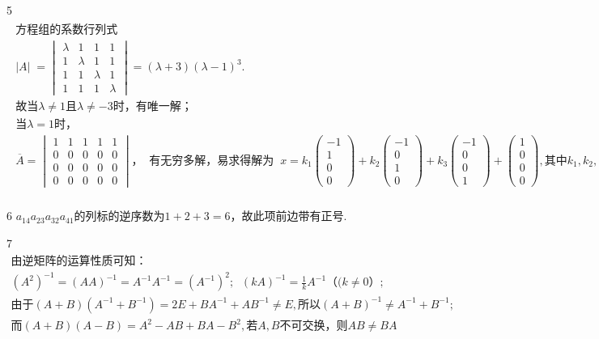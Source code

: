 5
$\begin{array}{l}\begin{array}{l}\mathrm{方程组的系数行列式}\\\left|A\right|\;=\begin{vmatrix}\lambda&1&1&1\\1&\lambda&1&1\\1&1&\lambda&1\\1&1&1&\lambda\end{vmatrix}=\left(\lambda+3\right)\left(\lambda-1\right)^3.\;\;\\\mathrm{故当}\lambda\neq1且\lambda\neq-3时，\mathrm{有唯一解}；\;\;\\当\lambda=1时，\\\overline A=\begin{vmatrix}1&1&1&1&1\\0&0&0&0&0\\0&0&0&0&0\\0&0&0&0&0\end{vmatrix}，\;\;\mathrm{有无穷多解}，\mathrm{易求得解为}\;\;x=k_1\begin{pmatrix}-1\\1\\0\\0\end{pmatrix}+k_2\begin{pmatrix}-1\\0\\1\\0\end{pmatrix}+k_3\begin{pmatrix}-1\\0\\0\\1\end{pmatrix}+\begin{pmatrix}1\\0\\0\\0\end{pmatrix},\mathrm{其中}k_1,k_2,k_3\in R\end{array}\\\end{array}$


6
$a_{14}a_{23}a_{32}a_{41}\mathrm{的列标的逆序数为}1+2+3=6，\mathrm{故此项前边带有正号}.$


7
$\begin{array}{l}\mathrm{由逆矩阵的运算性质可知}：\\(A^2)^{-1}=(AA)^{-1}=A^{-1}A^{-1}=(A^{-1})^2;\;\;(kA)^{-1}=\frac1kA^{-1}（(k\neq0）;\\\mathrm{由于}(A+B)(A^{-1}+B^{-1})=2E+BA^{-1}+AB^{-1}\neq E,\mathrm{所以}(A+B)^{-1}\neq A^{-1}+B^{-1};\\而(A+B)(A-B)=A^2-AB+BA-B^2,若A,B\mathrm{不可交换}，则AB\neq BA\end{array}$


